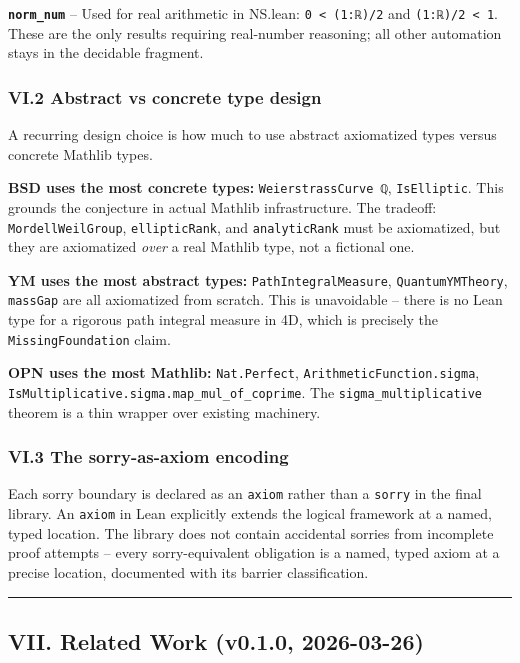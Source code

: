 \documentclass[12pt,a4paper]{article}
\begin{document}
\textbf{\texttt{norm\_num}}  --  Used for real arithmetic in NS.lean: \texttt{0 \textless{} (1:ℝ)/2} and \texttt{(1:ℝ)/2 \textless{} 1}. These are the only results requiring real-number reasoning; all other automation stays in the decidable fragment.

\subsubsection{VI.2 Abstract vs concrete type design}

A recurring design choice is how much to use abstract axiomatized types versus concrete Mathlib types.

\textbf{BSD uses the most concrete types:} \texttt{WeierstrassCurve ℚ}, \texttt{IsElliptic}. This grounds the conjecture in actual Mathlib infrastructure. The tradeoff: \texttt{MordellWeilGroup}, \texttt{ellipticRank}, and \texttt{analyticRank} must be axiomatized, but they are axiomatized \emph{over} a real Mathlib type, not a fictional one.

\textbf{YM uses the most abstract types:} \texttt{PathIntegralMeasure}, \texttt{QuantumYMTheory}, \texttt{massGap} are all axiomatized from scratch. This is unavoidable  --  there is no Lean type for a rigorous path integral measure in 4D, which is precisely the \texttt{MissingFoundation} claim.

\textbf{OPN uses the most Mathlib:} \texttt{Nat.Perfect}, \texttt{ArithmeticFunction.sigma}, \texttt{IsMultiplicative.sigma.map\_mul\_of\_coprime}. The \texttt{sigma\_multiplicative} theorem is a thin wrapper over existing machinery.

\subsubsection{VI.3 The sorry-as-axiom encoding}

Each sorry boundary is declared as an \texttt{axiom} rather than a \texttt{sorry} in the final library. An \texttt{axiom} in Lean explicitly extends the logical framework at a named, typed location. The library does not contain accidental sorries from incomplete proof attempts  --  every sorry-equivalent obligation is a named, typed axiom at a precise location, documented with its barrier classification.

\begin{center}
\rule{0.5\textwidth}{0.4pt}
\end{center}

\subsection{VII. Related Work (v0.1.0, 2026-03-26)}
\end{document}
